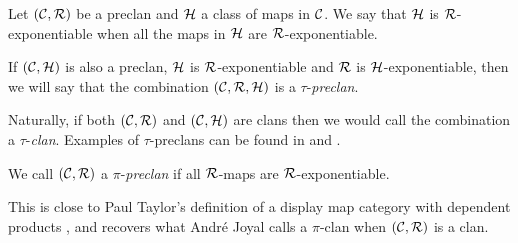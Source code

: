 \begin{definition}\label{def:double-preclan}
  Let $(\mathcal{C},\mathcal{R})$ be a preclan
  and $\mathcal{H}$ a class of maps in $\mathcal{C}$.
  We say that $\mathcal{H}$ is $\mathcal{R}$-exponentiable when all the
  maps in $\mathcal{H}$ are $\mathcal{R}$-exponentiable.

  If $(\mathcal{C},\mathcal{H})$ is also a preclan, $\mathcal{H}$ is $\mathcal{R}$-exponentiable
  and $\mathcal{R}$ is $\mathcal{H}$-exponentiable,
  then we will say that the combination
  $(\mathcal{C},\mathcal{R},\mathcal{H})$ is a $\tau$-\emph{preclan}.
\end{definition}

Naturally, if both $(\mathcal{C},\mathcal{R})$ and $(\mathcal{C},\mathcal{H})$
are clans then we would call the
combination a $\tau$-\emph{clan}.
Examples of $\tau$-preclans can be found in  and
.

\begin{definition}\label{def:pi-preclan}
  We call $(\mathcal{C}, \mathcal{R})$ a $\pi$-\emph{preclan}
  if all $\mathcal{R}$-maps are $\mathcal{R}$-exponentiable.
\end{definition}

This is close to Paul Taylor's definition of a
display map category with dependent products \cite{taylor1987},
and recovers what Andr\'e Joyal calls a $\pi$-clan \cite{joyal2017}
when $(\mathcal{C},\mathcal{R})$ is a clan.

